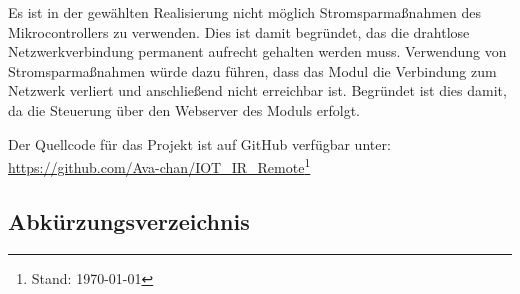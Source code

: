Es ist in der gewählten Realisierung nicht möglich Stromsparmaßnahmen des Mikrocontrollers zu verwenden.
Dies ist damit begründet, das die drahtlose Netzwerkverbindung permanent aufrecht gehalten werden muss.
Verwendung von Stromsparmaßnahmen würde dazu führen, dass das Modul die Verbindung zum Netzwerk verliert und anschließend nicht erreichbar ist.
Begründet ist dies damit, da die Steuerung über den Webserver des Moduls erfolgt.

Der Quellcode für das Projekt ist auf GitHub verfügbar unter:\\ \url{https://github.com/Ava-chan/IOT_IR_Remote}\footnote{Stand: \today}

\pagebreak

\begin{appendix}
\pagestyle{empty}	
\section{Abkürzungsverzeichnis}


\end{appendix}
